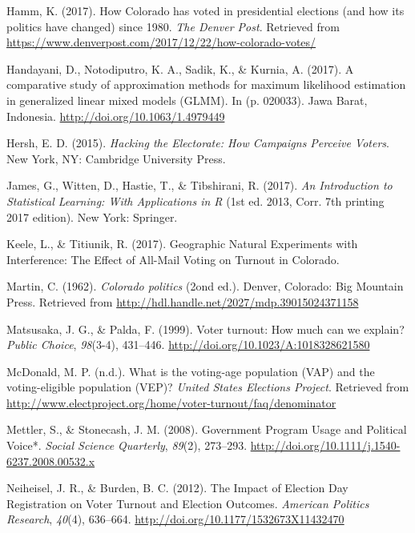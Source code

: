\documentclass[12pt,twoside]{reedthesis}
\begin{document}
  \hypertarget{ref-hamm_how_2017}{}
  Hamm, K. (2017). How Colorado has voted in presidential elections (and
  how its politics have changed) since 1980. \emph{The Denver Post}.
  Retrieved from
  \url{https://www.denverpost.com/2017/12/22/how-colorado-votes/}
  
  \hypertarget{ref-handayani_comparative_2017}{}
  Handayani, D., Notodiputro, K. A., Sadik, K., \& Kurnia, A. (2017). A
  comparative study of approximation methods for maximum likelihood
  estimation in generalized linear mixed models (GLMM). In (p. 020033).
  Jawa Barat, Indonesia. \url{http://doi.org/10.1063/1.4979449}
  
  \hypertarget{ref-hersh_hacking_2015}{}
  Hersh, E. D. (2015). \emph{Hacking the Electorate: How Campaigns
  Perceive Voters}. New York, NY: Cambridge University Press.
  
  \hypertarget{ref-james_introduction_2017}{}
  James, G., Witten, D., Hastie, T., \& Tibshirani, R. (2017). \emph{An
  Introduction to Statistical Learning: With Applications in R} (1st ed.
  2013, Corr. 7th printing 2017 edition). New York: Springer.
  
  \hypertarget{ref-keele_geographic_2017}{}
  Keele, L., \& Titiunik, R. (2017). Geographic Natural Experiments with
  Interference: The Effect of All-Mail Voting on Turnout in Colorado.
  
  \hypertarget{ref-martin_colorado_1962}{}
  Martin, C. (1962). \emph{Colorado politics} (2ond ed.). Denver,
  Colorado: Big Mountain Press. Retrieved from
  \url{http://hdl.handle.net/2027/mdp.39015024371158}
  
  \hypertarget{ref-matsusaka_voter_1999}{}
  Matsusaka, J. G., \& Palda, F. (1999). Voter turnout: How much can we
  explain? \emph{Public Choice}, \emph{98}(3-4), 431--446.
  \url{http://doi.org/10.1023/A:1018328621580}
  
  \hypertarget{ref-mcdonald_what_nodate}{}
  McDonald, M. P. (n.d.). What is the voting-age population (VAP) and the
  voting-eligible population (VEP)? \emph{United States Elections
  Project}. Retrieved from
  \url{http://www.electproject.org/home/voter-turnout/faq/denominator}
  
  \hypertarget{ref-mettler_government_2008}{}
  Mettler, S., \& Stonecash, J. M. (2008). Government Program Usage and
  Political Voice*. \emph{Social Science Quarterly}, \emph{89}(2),
  273--293. \url{http://doi.org/10.1111/j.1540-6237.2008.00532.x}
  
  \hypertarget{ref-neiheisel_impact_2012}{}
  Neiheisel, J. R., \& Burden, B. C. (2012). The Impact of Election Day
  Registration on Voter Turnout and Election Outcomes. \emph{American
  Politics Research}, \emph{40}(4), 636--664.
  \url{http://doi.org/10.1177/1532673X11432470}
  
\end{document}
